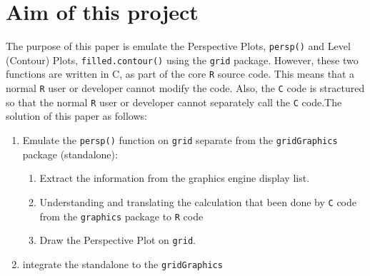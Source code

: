 \documentclass[paper=a4, fontsize=11pt]{report}
\begin{document}
\section{Aim of this project}
The purpose of this paper is emulate the Perspective Plots, \texttt{persp()} and Level (Contour) Plots, \texttt{filled.contour()} using the \texttt{grid} package. However, these two functions are written in C, as part of the core \texttt{R} source code. This means that a normal \texttt{R} user or developer cannot modify the code. Also, the \texttt{C} code is stractured so that the normal \texttt{R} user or developer cannot separately call the \texttt{C} code.The solution of this paper as follows: 
\newpage
\begin{enumerate}
  \item Emulate the \texttt{persp()} function on \texttt{grid} separate from the \texttt{gridGraphics} package (standalone):
    \begin{enumerate}
      \item Extract the information from the graphics engine display list.
      \item Understanding and translating the calculation that been done by \texttt{C} code from the \texttt{graphics} package to \texttt{R} code
      \item Draw the Perspective Plot on \texttt{grid}.
    \end{enumerate}
  \item integrate the standalone to the \texttt{gridGraphics}
\end{enumerate}



\end{document}
